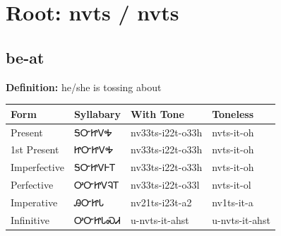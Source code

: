 \documentclass{article}%
\begin{document}
%
\normalsize%
\section*{Root: nvts / nvts}%
\subsection*{be-at}%
\textbf{Definition: }%
he/she is tossing about%
\\[0.5em]%
\begin{tabular}{|l|l|l|l|}%
\hline%
\textbf{Form}&\textbf{Syllabary}&\textbf{With Tone}&\textbf{Toneless}\\%
\hline%
Present&ᎦᏅᏥᏙᎭ&nv33ts{-}i22t{-}o33h&nvts{-}it{-}oh\\%
1st Present&ᏥᏅᏥᏙᎭ&nv33ts{-}i22t{-}o33h&nvts{-}it{-}oh\\%
Imperfective&ᎦᏅᏥᏙᎰᎢ&nv33ts{-}i22t{-}o33h&nvts{-}it{-}oh\\%
Perfective&ᎤᏅᏥᏙᎸᎢ&nv33ts{-}i22t{-}o33l&nvts{-}it{-}ol\\%
Imperative&ᎯᏅᏥᏓ&nv21ts{-}i23t{-}a2&nv1ts{-}it{-}a\\%
Infinitive&ᎤᏅᏥᏓᏍᏗ&u{-}nvts{-}it{-}ahst&u{-}nvts{-}it{-}ahst\\%
\hline%
\end{tabular}%
\\[1em]%
\end{document}
